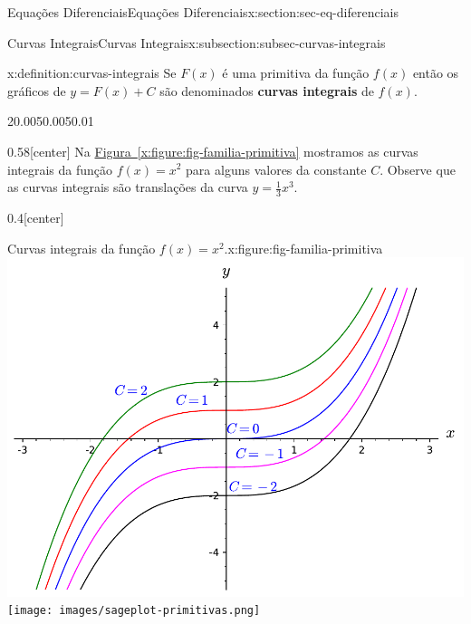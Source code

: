 \documentclass[oneside,10pt,]{article}
\newcommand{\xreffont}{\relax}
\newcommand{\terminology}[1]{\textbf{#1}}
\numberwithin{equation}{section}
\begin{document}
\begin{sectionptx}{Equações Diferenciais}{}{Equações Diferenciais}{}{}{x:section:sec-eq-diferenciais}
%
%
\typeout{************************************************}
\typeout{************************************************}
%
\begin{subsectionptx}{Curvas Integrais}{}{Curvas Integrais}{}{}{x:subsection:subsec-curvas-integrais}
\begin{definition}{}{x:definition:curvas-integrais}%
Se \(F(x)\) é uma primitiva da função \(f(x)\) então os gráficos de \(y=F(x)+C\) são denominados  \terminology{curvas integrais} de \(f(x)\).\end{definition}
\begin{sidebyside}{2}{0.005}{0.005}{0.01}%
\begin{sbspanel}{0.58}[center]%
Na \hyperref[x:figure:fig-familia-primitiva]{Figura~{\xreffont\ref{x:figure:fig-familia-primitiva}}} mostramos as curvas integrais da função \(f(x)=x^2\) para alguns valores da constante \(C\).  Observe que as curvas integrais são translações \footnotemark{} da curva \(y=\frac{1}{3}x^3\).%
\end{sbspanel}%
\begin{sbspanel}{0.4}[center]%
\begin{figureptx}{Curvas integrais da função \(f(x)=x^2\).}{x:figure:fig-familia-primitiva}{}%
%
{\includegraphics[width=\linewidth]{images/sageplot-primitivas.pdf}}%
{\texttt{[image: images/sageplot-primitivas.png]}}
\tcblower
\end{figureptx}%

\end{sbspanel}
\end{sidebyside}
\end{subsectionptx}
\end{sectionptx}
\end{document}
